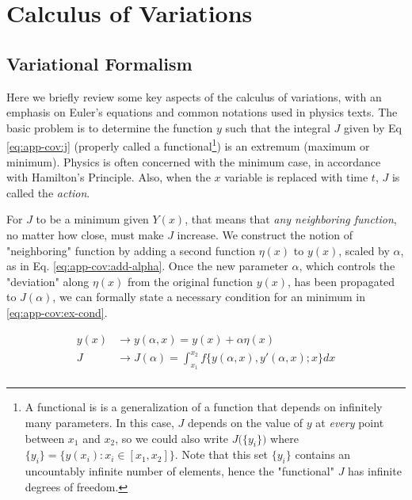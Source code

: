 \newpage
\chapter{Calculus of Variations}
\label{app:calcvar}

\section{Variational Formalism}
Here we briefly review some key aspects of the calculus of variations, with an emphasis on Euler's equations and common notations used in physics texts. The basic problem is to determine the function $y$ such that the integral $J$ given by Eq \ref{eq:app-cov:j} (properly called a functional\footnote{A functional is is a generalization of a function that depends on infinitely many parameters. In this case, $J$ depends on the value of $y$ at \textit{every} point between $x_1$ and $x_2$, so we could also write $J\big(\{y_i\}\big)$ where $\{y_i\}=\{y(x_i):x_i\in[x_1, x_2]\}$. Note that this set $\{y_i\}$ contains an uncountably infinite number of elements, hence the "functional" $J$ has infinite degrees of freedom.}) is an extremum (maximum or minimum). Physics is often concerned with the minimum case, in accordance with Hamilton's Principle. Also, when the $x$ variable is replaced with time $t$, $J$ is called the \textit{action}. 



For $J$ to be a minimum given $Y(x)$, that means that \textit{any neighboring function}, no matter how close, must make $J$ increase. We construct the notion of "neighboring" function by adding a  second function $\eta(x)$ to $y(x)$, scaled by $\alpha$, as in Eq. \ref{eq:app-cov:add-alpha}. Once the new parameter $\alpha$, which controls the "deviation" along $\eta(x)$ from the original function $y(x)$, has been propagated to $J(\alpha)$, we can formally state a necessary condition for an minimum in \ref{eq:app-cov:ex-cond}. 

\begin{equation}
	\label{eq:app-cov:add-alpha}
	\begin{split}
		y(x) & \rightarrow y(\alpha, x) = y(x) + \alpha\eta(x) \\
		J & \rightarrow J(\alpha) = \int_{x_1}^{x_2}f\big\{y(\alpha, x), y'(\alpha, x); x\big\}dx \\
	\end{split}
\end{equation}

